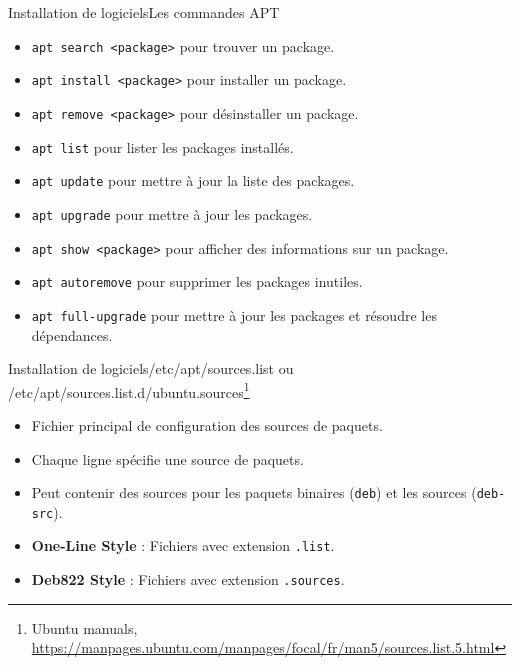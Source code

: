 \documentclass{beamer}
\begin{document}
    \begin{frame}{Installation de logiciels}{Les commandes APT}
        \begin{itemize}
            \item \lstinline{apt search <package>} pour trouver un package.
            \item \lstinline{apt install <package>} pour installer un package.
            \item \lstinline{apt remove <package>} pour désinstaller un package.
            \item \lstinline{apt list} pour lister les packages installés.
            \item \lstinline{apt update} pour mettre à jour la liste des packages.
            \item \lstinline{apt upgrade} pour mettre à jour les packages.
            \item \lstinline{apt show <package>} pour afficher des informations sur un package.
            \item \lstinline{apt autoremove} pour supprimer les packages inutiles.
            \item \lstinline{apt full-upgrade} pour mettre à jour les packages et résoudre les dépendances.
        \end{itemize}
    \end{frame}

    \begin{frame}{Installation de logiciels}{/etc/apt/sources.list ou /etc/apt/sources.list.d/ubuntu.sources\footnote{\label{sources}Ubuntu manuals, \url{https://manpages.ubuntu.com/manpages/focal/fr/man5/sources.list.5.html}}}
        \begin{itemize}
            \item Fichier principal de configuration des sources de paquets.
            \item Chaque ligne spécifie une source de paquets.
            \item Peut contenir des sources pour les paquets binaires (\lstinline{deb}) et les sources (\lstinline{deb-src}).
            \item \textbf{One-Line Style} : Fichiers avec extension \lstinline{.list}.
            \item \textbf{Deb822 Style} : Fichiers avec extension \lstinline{.sources}.
        \end{itemize}
    \end{frame}
\end{document}

